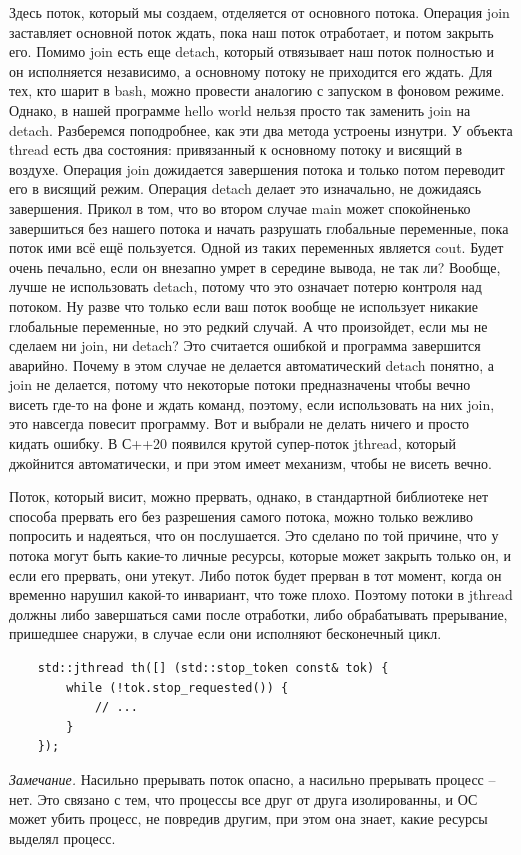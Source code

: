 \documentclass[12pt, a4paper]{article}
\begin{document}
Здесь поток, который мы создаем, отделяется от основного потока. Операция join заставляет основной поток ждать, пока наш поток отработает, и потом закрыть его. Помимо join есть еще detach, который отвязывает наш поток полностью и он исполняется независимо, а основному потоку не приходится его ждать. Для тех, кто шарит в bash, можно провести аналогию с запуском в фоновом режиме. Однако, в нашей программе hello world нельзя просто так заменить join на detach. Разберемся поподробнее, как эти два метода устроены изнутри. У объекта thread есть два состояния: привязанный к основному потоку и висящий в воздухе. Операция join дожидается завершения потока и только потом переводит его в висящий режим. Операция detach делает это изначально, не дожидаясь завершения. Прикол в том, что во втором случае main может спокойненько завершиться без нашего потока и начать разрушать глобальные переменные, пока поток ими всё ещё пользуется. Одной из таких переменных является cout. Будет очень печально, если он внезапно умрет в середине вывода, не так ли? Вообще, лучше не использовать detach, потому что это означает потерю контроля над потоком. Ну разве что только если ваш поток вообще не использует никакие глобальные переменные, но это редкий случай. А что произойдет, если мы не сделаем ни join, ни detach? Это считается ошибкой и программа завершится аварийно. Почему в этом случае не делается автоматический detach понятно, а join не делается, потому что некоторые потоки предназначены чтобы вечно висеть где-то на фоне и ждать команд, поэтому, если использовать на них join, это навсегда повесит программу. Вот и выбрали не делать ничего и просто кидать ошибку. В С++20 появился крутой супер-поток jthread, который джойнится автоматически, и при этом имеет механизм, чтобы не висеть вечно.
\par Поток, который висит, можно прервать, однако, в стандартной библиотеке нет способа прервать его без разрешения самого потока, можно только вежливо попросить и надеяться, что он послушается. Это сделано по той причине, что у потока могут быть какие-то личные ресурсы, которые может закрыть только он, и если его прервать, они утекут. Либо поток будет прерван в тот момент, когда он временно нарушил какой-то инвариант, что тоже плохо. Поэтому потоки в jthread должны либо завершаться сами после отработки, либо обрабатывать прерывание, пришедшее снаружи, в случае если они исполняют бесконечный цикл.
\begin{verbatim}
	std::jthread th([] (std::stop_token const& tok) {
		while (!tok.stop_requested()) {
			// ...
		}
	});
\end{verbatim}
\textit{Замечание.} Насильно прерывать поток опасно, а насильно прерывать процесс -- нет. Это связано с тем, что процессы все друг от друга изолированны, и ОС может убить процесс, не повредив другим, при этом она знает, какие ресурсы выделял процесс.
\end{document}

